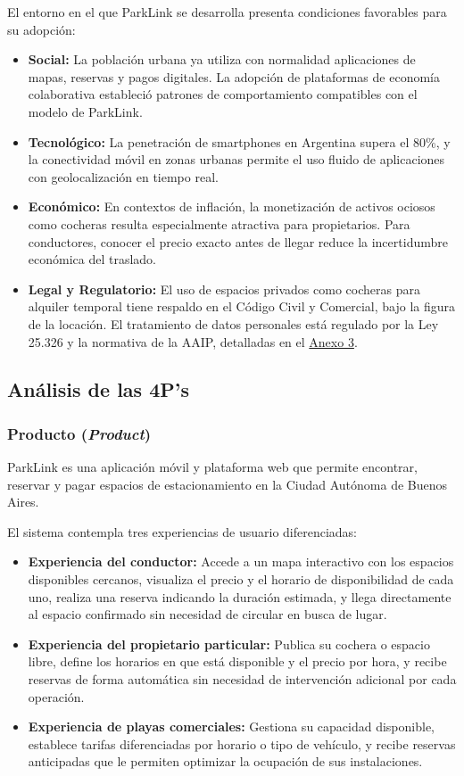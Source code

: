 El entorno en el que ParkLink se desarrolla presenta condiciones favorables para su adopción:

\begin{itemize}
    \item \textbf{Social:} La población urbana ya utiliza con normalidad aplicaciones de mapas, reservas y pagos digitales. La adopción de plataformas de economía colaborativa estableció patrones de comportamiento compatibles con el modelo de ParkLink.
    \item \textbf{Tecnológico:} La penetración de smartphones en Argentina supera el 80\%, y la conectividad móvil en zonas urbanas permite el uso fluido de aplicaciones con geolocalización en tiempo real.
    \item \textbf{Económico:} En contextos de inflación, la monetización de activos ociosos como cocheras resulta especialmente atractiva para propietarios. Para conductores, conocer el precio exacto antes de llegar reduce la incertidumbre económica del traslado.
    \item \textbf{Legal y Regulatorio:} El uso de espacios privados como cocheras para alquiler temporal tiene respaldo en el Código Civil y Comercial, bajo la figura de la locación. El tratamiento de datos personales está regulado por la Ley 25.326 y la normativa de la AAIP, detalladas en el \hyperref[anexo:legal]{Anexo 3}.
\end{itemize}

\subsection{Análisis de las 4P's}

\subsubsection{Producto (\textit{Product})}

ParkLink es una aplicación móvil y plataforma web que permite encontrar, reservar y pagar espacios de estacionamiento en la Ciudad Autónoma de Buenos Aires.

El sistema contempla tres experiencias de usuario diferenciadas:

\begin{itemize}
    \item \textbf{Experiencia del conductor:} Accede a un mapa interactivo con los espacios disponibles cercanos, visualiza el precio y el horario de disponibilidad de cada uno, realiza una reserva indicando la duración estimada, y llega directamente al espacio confirmado sin necesidad de circular en busca de lugar.
    \item \textbf{Experiencia del propietario particular:} Publica su cochera o espacio libre, define los horarios en que está disponible y el precio por hora, y recibe reservas de forma automática sin necesidad de intervención adicional por cada operación.
    \item \textbf{Experiencia de playas comerciales:} Gestiona su capacidad disponible, establece tarifas diferenciadas por horario o tipo de vehículo, y recibe reservas anticipadas que le permiten optimizar la ocupación de sus instalaciones.
\end{itemize}

